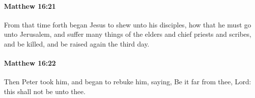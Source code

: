 		\paragraph{Matthew 16:21} %
			\label{MATTHEW-16-21}

			From that time forth began Jesus to shew unto his disciples, how that he must go unto Jerusalem, and suffer many things of the elders and chief priests and scribes, and be killed, and be raised again the third day.

			\begin{framed}
			\scriptsize
				\begin{compactdesc}
					\item[SBLG] 
				\end{compactdesc}
			\end{framed}

		\paragraph{Matthew 16:22} %
			\label{MATTHEW-16-22}

			Then Peter took him, and began to rebuke him, saying, Be it far from thee, Lord: this shall not be unto thee.

